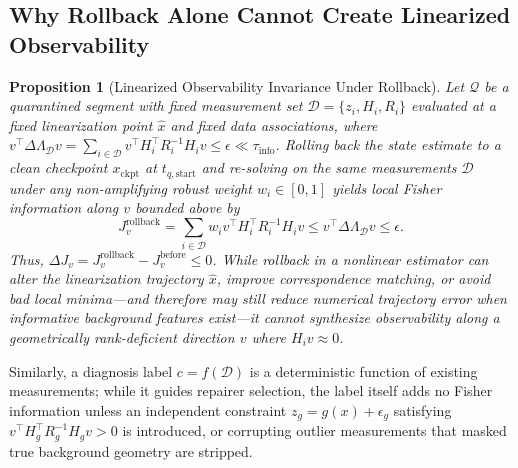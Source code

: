 \documentclass[journal]{IEEEtran}
\newtheorem{proposition}{Proposition}
\begin{document}
\subsection{Why Rollback Alone Cannot Create Linearized Observability}
\begin{proposition}[Linearized Observability Invariance Under Rollback]
\label{prop:rollback}
Let $\mathcal{Q}$ be a quarantined segment with fixed measurement set $\mathcal{D} = \{z_i, H_i, R_i\}$ evaluated at a fixed linearization point $\hat{x}$ and fixed data associations, where $v^\top \Delta\Lambda_{\mathcal{D}} v = \sum_{i\in\mathcal{D}} v^\top H_i^\top R_i^{-1} H_i v \le \epsilon \ll \tau_{\mathrm{info}}$. Rolling back the state estimate to a clean checkpoint $x_{\mathrm{ckpt}}$ at $t_{q,\mathrm{start}}$ and re-solving on the same measurements $\mathcal{D}$ under any non-amplifying robust weight $w_i \in [0,1]$ yields local Fisher information along $v$ bounded above by
\begin{equation}
    J_v^{\mathrm{rollback}} = \sum_{i\in\mathcal{D}} w_i v^\top H_i^\top R_i^{-1} H_i v \le v^\top \Delta\Lambda_{\mathcal{D}} v \le \epsilon.
\end{equation}
Thus, $\Delta J_v = J_v^{\mathrm{rollback}} - J_v^{\mathrm{before}} \le 0$. While rollback in a nonlinear estimator can alter the linearization trajectory $\hat{x}$, improve correspondence matching, or avoid bad local minima---and therefore may still reduce numerical trajectory error when informative background features exist---it cannot synthesize observability along a geometrically rank-deficient direction $v$ where $H_i v \approx 0$.
\end{proposition}

Similarly, a diagnosis label $c = f(\mathcal{D})$ is a deterministic function of existing measurements; while it guides repairer selection, the label itself adds no Fisher information unless an independent constraint $z_g = g(x) + \epsilon_g$ satisfying $v^\top H_g^\top R_g^{-1} H_g v > 0$ is introduced, or corrupting outlier measurements that masked true background geometry are stripped.
\end{document}

